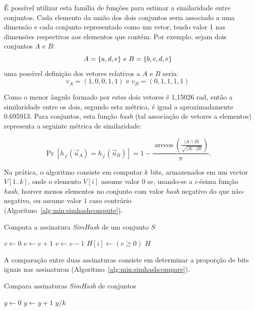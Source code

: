 É possível utilizar esta família de funções para estimar a similaridade entre conjuntos. Cada elemento da união dos dois conjuntos seria associado a uma dimensão e cada conjunto representado como um vetor, tendo valor 1 nas dimensões respectivas aos elementos que contém. Por exemplo, sejam dois conjuntos $A$ e $B$:
\[
    A = \{a, d, e\} \text{ e } \\
    B = \{b, c, d, e\}
\]
uma possível definição dos vetores relativos a $A$ e $B$ seria:
\[
    v_A = (1, 0, 0, 1, 1) \text{ e } 
    v_B = (0, 1, 1, 1, 1)
\]

Como o menor ângulo formado por estes dois vetores é 1,15026 rad, então a similaridade entre os dois, segundo esta métrica, é igual a aproximadamente 0.695913. Para conjuntos, esta função \emph{hash} (tal associação de vetores a elementos) representa a seguinte métrica de similaridade:

\[
    \Pr[h_{\vec{r}}(\vec{u}_A) = h_{\vec{r}}(\vec{u}_B)] = 1 - \frac{\arccos \left( \frac{|A \cap B|}{\sqrt{|A| \cdot |B|}}\right)}{\pi}\text{.}
\]

Na prática, o algoritmo consiste em computar $k$ bits, armazenados em um vector $V[1..k]$, onde o elemento $V[i]$ assume valor $0$ se, usando-se a $i$-ésima função \emph{hash}, houver menos elementos no conjunto com valor \emph{hash} negativo do que não-negativo, ou assume valor $1$ caso contrário (Algoritmo~\ref{alg:min:simhashcompute}).

\begin{algorithm}
\linespread{1}\selectfont
\caption{Computa a assinatura \emph{SimHash} de um conjunto $S$}
\label{alg:min:simhashcompute}
\begin{algorithmic}[1]
        \State $v \gets 0$
                \State $v \gets v + 1$
            \Else
                \State $v \gets v - 1$
            \EndIf
	    \EndFor
        \State $H[i] \gets (v \geq 0)$
	\EndFor
	\Return $H$
\EndFunction
\end{algorithmic}
\end{algorithm}

A comparação entre duas assinaturas consiste em determinar a proporção de bits iguais nas assinaturas (Algoritmo~\ref{alg:min:simhashcompare}).

\begin{algorithm}
\linespread{1}\selectfont
\caption{Compara assinaturas \emph{SimHash} de conjuntos}
\label{alg:min:simhashcompare}
\begin{algorithmic}[1]
    \State $y \gets 0$
            \State $y \gets y + 1$
        \EndIf
	\EndFor
	\Return $y/k$
\EndFunction
\end{algorithmic}
\end{algorithm}

